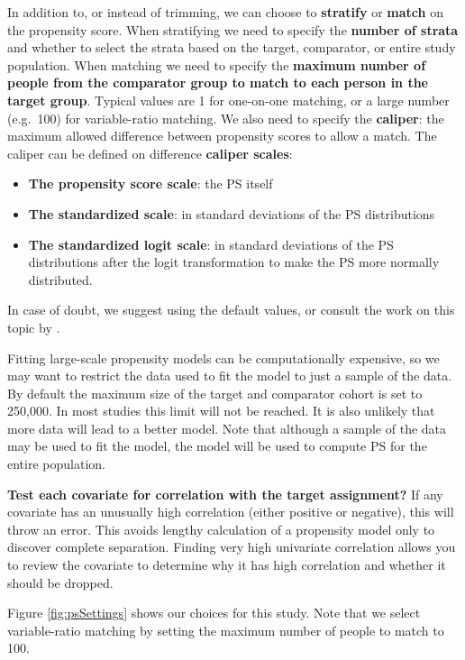 \documentclass[]{book}
\providecommand{\tightlist}{%
  \setlength{\itemsep}{0pt}\setlength{\parskip}{0pt}}
\begin{document}
In addition to, or instead of trimming, we can choose to \textbf{stratify} or \textbf{match} on the propensity score. When stratifying we need to specify the \textbf{number of strata} and whether to select the strata based on the target, comparator, or entire study population. When matching we need to specify the \textbf{maximum number of people from the comparator group to match to each person in the target group}. Typical values are 1 for one-on-one matching, or a large number (e.g.~100) for variable-ratio matching. We also need to specify the \textbf{caliper}: the maximum allowed difference between propensity scores to allow a match. The caliper can be defined on difference \textbf{caliper scales}: 

\begin{itemize}
\tightlist
\item
  \textbf{The propensity score scale}: the PS itself
\item
  \textbf{The standardized scale}: in standard deviations of the PS distributions
\item
  \textbf{The standardized logit scale}: in standard deviations of the PS distributions after the logit transformation to make the PS more normally distributed.
\end{itemize}

In case of doubt, we suggest using the default values, or consult the work on this topic by \citet{austin_2011}.

Fitting large-scale propensity models can be computationally expensive, so we may want to restrict the data used to fit the model to just a sample of the data. By default the maximum size of the target and comparator cohort is set to 250,000. In most studies this limit will not be reached. It is also unlikely that more data will lead to a better model. Note that although a sample of the data may be used to fit the model, the model will be used to compute PS for the entire population.

\textbf{Test each covariate for correlation with the target assignment?} If any covariate has an unusually high correlation (either positive or negative), this will throw an error. This avoids lengthy calculation of a propensity model only to discover complete separation. Finding very high univariate correlation allows you to review the covariate to determine why it has high correlation and whether it should be dropped.

Figure \ref{fig:psSettings} shows our choices for this study. Note that we select variable-ratio matching by setting the maximum number of people to match to 100.
\end{document}
